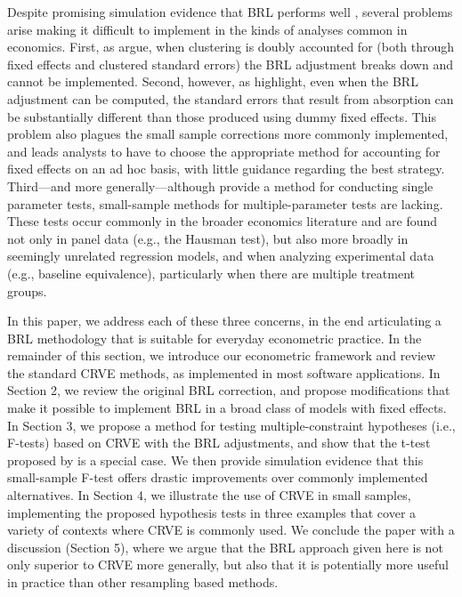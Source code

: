 \documentclass[12pt]{article}\usepackage[]{graphicx}\usepackage[]{color}
\begin{document}
Despite promising simulation evidence that BRL performs well \citep[e.g.,][]{Imbens2012robust}, several problems arise making it difficult to implement in the kinds of analyses common in economics. 
First, as \citet{Angrist2009mostly} argue, when clustering is doubly accounted for (both through fixed effects and clustered standard errors) the BRL adjustment breaks down and cannot be implemented.
Second, however, as \citet{Cameron2015practitioners} highlight, even when the BRL adjustment can be computed, the standard errors that result from absorption can be substantially different than those produced using dummy fixed effects. 
This problem also plagues the small sample corrections more commonly implemented, and leads analysts to have to choose the appropriate method for accounting for fixed effects on an ad hoc basis, with little guidance regarding the best strategy.
Third---and more generally---although \citet{Bell2002bias} provide a method for conducting single parameter tests, small-sample methods for multiple-parameter tests are lacking.
These tests occur commonly in the broader economics literature and are found not only in panel data (e.g., the Hausman test), but also more broadly in seemingly unrelated regression models, and when analyzing experimental data (e.g., baseline equivalence), particularly when there are multiple treatment groups. 

In this paper, we address each of these three concerns, in the end articulating a BRL methodology that is suitable for everyday econometric practice. 
In the remainder of this section, we introduce our econometric framework and review the standard CRVE methods, as implemented in most software applications. 
In Section 2, we review the original BRL correction, and propose modifications that make it possible to implement BRL in a broad class of models with fixed effects.
In Section 3, we propose a method for testing multiple-constraint hypotheses (i.e., F-tests) based on CRVE with the BRL adjustments, and show that the t-test proposed by \citet{Bell2002bias} is a special case. 
We then provide simulation evidence that this small-sample F-test offers drastic improvements over commonly implemented alternatives.
In Section 4, we illustrate the use of CRVE in small samples, implementing the proposed hypothesis tests in three examples that cover a variety of contexts where CRVE is commonly used. 
We conclude the paper with a discussion (Section 5), where we argue that the BRL approach given here is not only superior to CRVE more generally, but also that it is potentially more useful in practice than other resampling based methods. 
\end{document}
